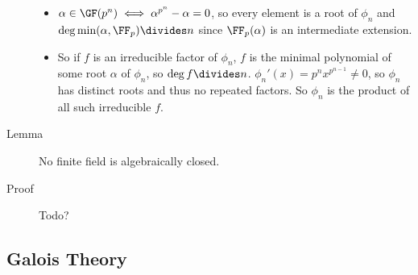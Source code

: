 \begin{description}
\begin{itemize}
\item
  \(\alpha \in \GF(p^n) \iff \alpha^{p^n} - \alpha = 0\), so every
  element is a root of \(\phi_n\) and
  \(\deg \min(\alpha, \FF_p) \divides n\) since \(\FF_p(\alpha)\) is an
  intermediate extension.
\item
  So if \(f\) is an irreducible factor of \(\phi_n\), \(f\) is the
  minimal polynomial of some root \(\alpha\) of \(\phi_n\), so
  \(\deg f \divides n\). \(\phi_n'(x) = p^nx^{p^{n-1}} \neq 0\), so
  \(\phi_n\) has distinct roots and thus no repeated factors. So
  \(\phi_n\) is the product of all such irreducible \(f\).
\end{itemize}
\item[Lemma]
No finite field is algebraically closed.
\item[Proof]
Todo?
\end{description}

\hypertarget{galois-theory}{%
\subsection{Galois Theory}\label{galois-theory}}

